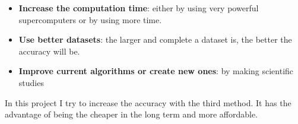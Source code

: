 \documentclass{article}
\begin{document}
    \begin{itemize}
        \item \textbf{Increase the computation time}: either by using very
        powerful supercomputers or by using more time.
        \item \textbf{Use better datasets}: the larger and complete a dataset
        is, the better the accuracy will be.
        \item \textbf{Improve current algorithms or create new ones}: by making
        scientific studies
    \end{itemize}

    In this project I try to increase the accuracy with the third method. It has
    the advantage of being the cheaper in the long term and more affordable.

\end{document}
